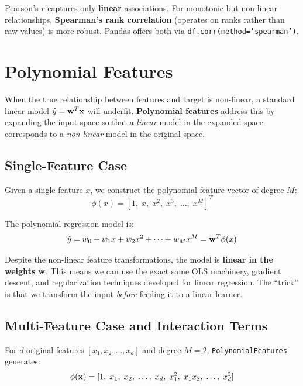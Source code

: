 \begin{remark}
Pearson's $r$ captures only \textbf{linear} associations. For monotonic but non-linear relationships, \textbf{Spearman's rank correlation} (operates on ranks rather than raw values) is more robust. Pandas offers both via \texttt{df.corr(method='spearman')}.
\end{remark}

\section*{Polynomial Features}

When the true relationship between features and target is non-linear, a standard linear model $\hat{y} = \mathbf{w}^T\mathbf{x}$ will underfit. \textbf{Polynomial features} address this by expanding the input space so that a \emph{linear} model in the expanded space corresponds to a \emph{non-linear} model in the original space.

\subsection*{Single-Feature Case}

Given a single feature $x$, we construct the polynomial feature vector of degree $M$:
$$\phi(x) = [1,\; x,\; x^2,\; x^3,\; \dots,\; x^M]^T$$

The polynomial regression model is:
$$\hat{y} = w_0 + w_1 x + w_2 x^2 + \dots + w_M x^M = \mathbf{w}^T \phi(x)$$

\begin{remark}
Despite the non-linear feature transformations, the model is \textbf{linear in the weights} $\mathbf{w}$. This means we can use the exact same OLS machinery, gradient descent, and regularization techniques developed for linear regression. The ``trick'' is that we transform the input \emph{before} feeding it to a linear learner.
\end{remark}

\subsection*{Multi-Feature Case and Interaction Terms}

For $d$ original features $[x_1, x_2, \dots, x_d]$ and degree $M = 2$, \texttt{PolynomialFeatures} generates:
$$\phi(\mathbf{x}) = [1,\; x_1,\; x_2,\; \dots,\; x_d,\; x_1^2,\; x_1 x_2,\; \dots,\; x_d^2]$$

